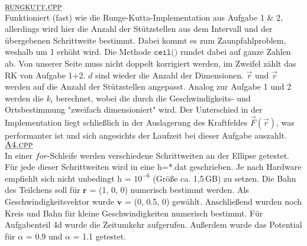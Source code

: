	
	$\underline{\textsc{rungkutt.cpp}}$ \\
 Funktioniert (fast) wie die Runge-Kutta-Implementation aus Aufgabe 1 \& 2, allerdings wird hier die Anzahl der Stützstellen aus dem Intervall und der übergebenen Schrittweite bestimmt. Dabei kommt es zum Zaunpfahlproblem\cite{zaun}, weshalb um 1 erhöht wird. Die Methode $\texttt{ceil()}$ rundet dabei auf ganze Zahlen ab. Von unserer Seite muss nicht doppelt korrigiert werden, im Zweifel zählt das RK von Aufgabe 1+2. $d$ sind wieder die Anzahl der Dimensionen. $\vec{r}$ und $\vec{v}$ werden auf die Anzahl der Stützstellen angepasst. Analog zur Aufgabe 1 und 2 werden die $k_i$ berechnet, wobei die durch die Geschwindigkeits- und Ortsbestimmung "zweifach dimensioniert" wird. Der Unterschied in der Implementation liegt schließlich in der Auslagerung des Kraftfeldes $\vec{F}(\vec{r})$, was performanter ist und sich angesichts der Laufzeit bei dieser Aufgabe auszahlt.\\	
	
	$\underline{\textsc{A4.cpp}}$ \\
In einer $\textit{for}$-Schleife werden verschiedene Schrittweiten an der Ellipse getestet. Für jede dieser Schrittweiten wird in eine h=*.dat geschrieben. Je nach Hardware empfiehlt sich nicht unbedingt h = $10^{-6}$ (Größe ca. 1,5$\,$GB) zu setzen. Die Bahn des Teilchens soll für $\textbf{r}$ = (1, 0, 0) numerisch bestimmt werden. Als Geschwindigkeitsvektor wurde $\textbf{v}$ = (0, 0.5, 0) gewählt. Anschließend wurden noch Kreis und Bahn für kleine Geschwindigkeiten numerisch bestimmt. Für Aufgabenteil 4d wurde die Zeitumkehr aufgerufen. Außerdem wurde das Potential für $\alpha$ = 0.9 und $\alpha$ = 1.1 getestet.

\printbibliography
